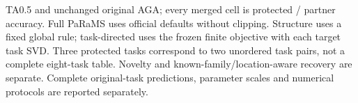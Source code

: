 \begin{table}[!htbp]
\begin{tabular}{lrrrrr}
\bottomrule
\end{tabular}
\par\vspace{3pt}\begin{minipage}{0.98\linewidth}\footnotesize TA0.5 and unchanged original AGA; every merged cell is protected / partner accuracy. Full PaRaMS uses official defaults without clipping. Structure uses a fixed global rule; task-directed uses the frozen finite objective with each target task SVD. Three protected tasks correspond to two unordered task pairs, not a complete eight-task table. Novelty and known-family/location-aware recovery are separate. Complete original-task predictions, parameter scales and numerical protocols are reported separately.\end{minipage}
\end{table}

